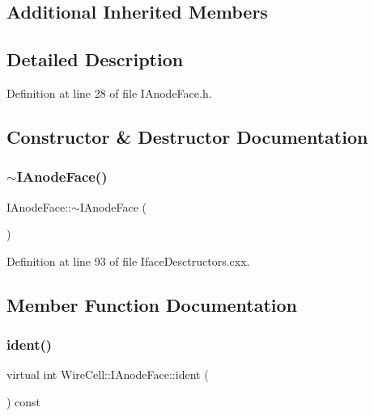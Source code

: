 \subsection*{Additional Inherited Members}


\subsection{Detailed Description}


Definition at line 28 of file I\+Anode\+Face.\+h.



\subsection{Constructor \& Destructor Documentation}
\mbox{\label{class_wire_cell_1_1_i_anode_face_a51aff7f109b09620fc5eb6ce5586eb8a}} 
\subsubsection{\texorpdfstring{$\sim$\+I\+Anode\+Face()}{~IAnodeFace()}}
{\footnotesize\ttfamily I\+Anode\+Face\+::$\sim$\+I\+Anode\+Face (\begin{DoxyParamCaption}{ }\end{DoxyParamCaption})\hspace{0.3cm}{\ttfamily [virtual]}}



Definition at line 93 of file Iface\+Desctructors.\+cxx.



\subsection{Member Function Documentation}
\mbox{\label{class_wire_cell_1_1_i_anode_face_a2090bdf3aac37747dcc831ce1529bf53}} 
\subsubsection{\texorpdfstring{ident()}{ident()}}
{\footnotesize\ttfamily virtual int Wire\+Cell\+::\+I\+Anode\+Face\+::ident (\begin{DoxyParamCaption}{ }\end{DoxyParamCaption}) const\hspace{0.3cm}{\ttfamily [pure virtual]}}



